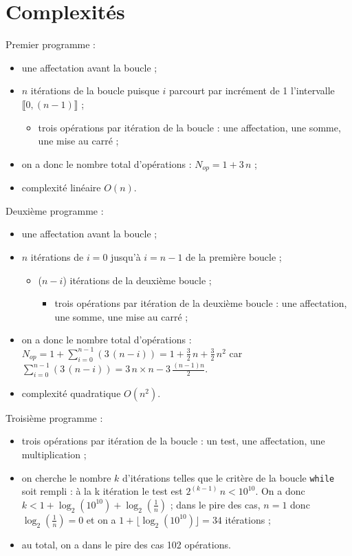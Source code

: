 \section{Complexités}

Premier programme : 
\begin{itemize}
  \item une affectation avant la boucle ;
  \item $n$ itérations de la boucle puisque $i$ parcourt par incrément de 1 l'intervalle $\llbracket 0, (n-1) \rrbracket$ ; 
      \begin{itemize}
      \item trois opérations par itération de la boucle : une affectation, une somme, une mise au carré ;                                                                                                                                                                         \end{itemize}
  \item on a donc le nombre total d'opérations : $N_{op} = 1 + 3\,n$ ;
  \item complexité linéaire $O(n)$.
\end{itemize}

Deuxième programme : 
\begin{itemize}
  \item une affectation avant la boucle ;
  \item $n$ itérations de $i=0$ jusqu'à $i=n-1$ de la première boucle ; 
      \begin{itemize}
	  \item ($n-i$) itérations de la deuxième boucle ;
	      \begin{itemize}
	      	\item trois opérations par itération de la deuxième boucle : une affectation, une somme, une mise au carré ;
	      \end{itemize}
      \end{itemize}
  \item on a donc le nombre total d'opérations : $\displaystyle N_{op} = 1 + \sum_{i=0}^{n-1} \left( 3\,(n-i)\right) = 1 + \frac{3}{2}\,n + \frac{3}{2}\,n^2$ car $\displaystyle\sum_{i=0}^{n-1} \left( 3\,(n-i)\right) = 3\,n\times n - 3\,\frac{(n-1)n}{2}$.
  \item complexité quadratique $O(n^2)$.
\end{itemize}

Troisième programme : 
\begin{itemize}
  \item trois opérations par itération de la boucle : un test, une affectation, une multiplication ;
  \item on cherche le nombre $k$ d'itérations telles que le critère de la boucle \texttt{while} soit rempli : à la k itération le test est $2^{(k-1)}\,n < 10^{10}$. On a donc $k < 1+\log_2(10^{10}) + \log_2(\frac{1}{n})$ ; dans le pire des cas, $n=1$ donc $\log_2(\frac{1}{n})= 0$ et on a $1+\lfloor \log_2(10^{10}) \rfloor = 34$ itérations ;
  \item au total, on a dans le pire des cas 102 opérations. 
\end{itemize}

